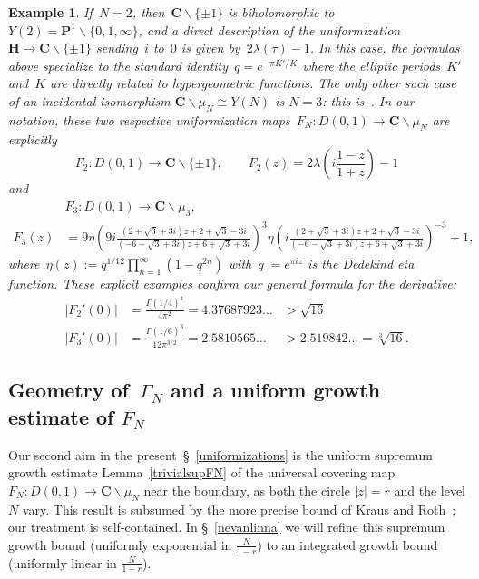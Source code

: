 \documentclass[10pt]{amsart}
\def\SSS{\S}
\def\SSSS{\S}
\renewcommand\setminus{\smallsetminus}
\newtheorem{example}[subsubsection]{Example}
\theoremstyle{remark}
\numberwithin{equation}{subsection}
\def\C{\mathbf{C}}
\def\H{\mathbf{H}}
\begin{document}
\begin{example} \label{ex23}   \emph{If~$N=2$, then~$\C \setminus \{\pm 1\}$ is biholomorphic to~$Y(2) = \mathbf{P}^1 \setminus \{0,1,\infty\}$, 
and a direct description of the uniformization~$\H \rightarrow \C \setminus \{\pm 1\}$  sending~$i$ to~$0$ is given by~$2 \lambda(\tau) - 1$.
In this case, the formulas above specialize to the standard identity~$q = e^{-\pi K'/K}$ where the elliptic periods~$K'$ and~$K$ are
directly related to hypergeometric functions. 
The only other such case of an incidental isomorphism $\C \setminus \mu_N \cong Y(N)$ is $N = 3$: this is~\cite[\SSS~6 Example~5]{Hempel}. In our notation, 
these two respective uniformization maps~$F_N : D(0,1) \to \C \setminus \mu_N$ are explicitly
$$
F_2 : D(0,1) \to \C \setminus \{\pm 1\}, \qquad F_2(z) = 2 \lambda \left( i \frac{1-z}{1+z} \right) - 1
$$
and
\begin{equation*}
\begin{aligned}
& F_3 : D(0,1) \to \C \setminus \mu_3,  \\  F_3(z)  & =   9\eta\left( 9i \frac{( 2 + \sqrt{3} + 3i)z + 2 + \sqrt{3} - 3i }{ (-6-\sqrt{3}+3i)z + 6 + \sqrt{3} + 3i } \right)^3  \eta\left( i \frac{( 2 + \sqrt{3} + 3i)z + 2 + \sqrt{3} - 3i }{ (-6-\sqrt{3}+3i)z + 6 + \sqrt{3} + 3i }  \right)^{-3} + 1,
\end{aligned}
\end{equation*}
where~$\eta(z) := q^{1/12} \prod_{n=1}^{\infty} (1-q^{2n})$ with~$q := e^{\pi i z}$ is the Dedekind eta function. These explicit examples confirm our general formula for the derivative: 
\begin{equation*}
\begin{aligned}
 |F_2'(0)| & = \frac{\Gamma(1/4)^4}{4\pi^2} = 4.37687923\ldots &  > \sqrt{16}  \\
|F_3'(0)| & = \frac{\Gamma(1/6)^3}{12\pi^{3/2}} = 2.5810565\ldots & > 2.519842\ldots = \sqrt[3]{16}. 
\end{aligned}
\end{equation*}}
\end{example}


\subsection{Geometry of~\texorpdfstring{$\Gamma_N$}{GammaN} and a uniform growth estimate of $F_N$}\label{GeoFNGN}
Our second aim in the present~\SSSS~\ref{uniformizations} is the uniform supremum growth estimate Lemma~\ref{trivialsupFN} of the universal covering map $F_N : D(0,1) \to \C \setminus \mu_N$ near the boundary,  as both the circle $|z| = r$ and the level $N$ vary. This result is subsumed by the more precise bound of Kraus and Roth~\cite[Theorems~1.2 and~1.10]{KrausRoth}; our treatment is self-contained. In \SSSS~\ref{nevanlinna} we will refine this  supremum growth bound  (uniformly exponential in $\frac{N}{1-r}$) to an integrated growth bound (uniformly linear in $\frac{N}{1-r}$). 
\end{document}
